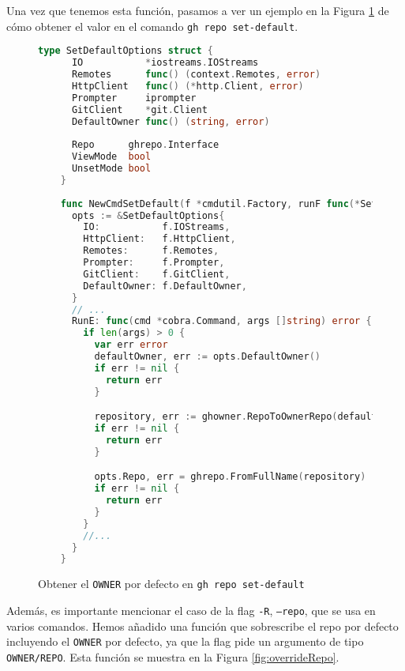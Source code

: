Una vez que tenemos esta función, pasamos a ver un ejemplo en la Figura \ref{fig:setDefaultOwner} de cómo obtener el valor en el comando \texttt{gh repo set-default}.

\begin{figure}[H]
  \begin{lstlisting}[language=GO]
    type SetDefaultOptions struct {
      IO           *iostreams.IOStreams
      Remotes      func() (context.Remotes, error)
      HttpClient   func() (*http.Client, error)
      Prompter     iprompter
      GitClient    *git.Client
      DefaultOwner func() (string, error)
    
      Repo      ghrepo.Interface
      ViewMode  bool
      UnsetMode bool
    }
    
    func NewCmdSetDefault(f *cmdutil.Factory, runF func(*SetDefaultOptions) error) *cobra.Command {
      opts := &SetDefaultOptions{
        IO:           f.IOStreams,
        HttpClient:   f.HttpClient,
        Remotes:      f.Remotes,
        Prompter:     f.Prompter,
        GitClient:    f.GitClient,
        DefaultOwner: f.DefaultOwner,
      }
      // ...
      RunE: func(cmd *cobra.Command, args []string) error {
        if len(args) > 0 {
          var err error
          defaultOwner, err := opts.DefaultOwner()
          if err != nil {
            return err
          }

          repository, err := ghowner.RepoToOwnerRepo(defaultOwner, args[0])
          if err != nil {
            return err
          }

          opts.Repo, err = ghrepo.FromFullName(repository)
          if err != nil {
            return err
          }
        }
        //...
      }
    }
  \end{lstlisting}
  \caption{Obtener el \texttt{OWNER} por defecto en \texttt{gh repo set-default}}
  \label{fig:setDefaultOwner}
\end{figure}

Además, es importante mencionar el caso de la flag \texttt{-R}, \texttt{--repo}, que se usa en varios comandos. Hemos añadido una función que sobrescribe el repo por defecto incluyendo el \texttt{OWNER} por defecto, ya que la flag pide un argumento de tipo \texttt{OWNER/REPO}. Esta función se muestra en la Figura \ref{fig:overrideRepo}.

